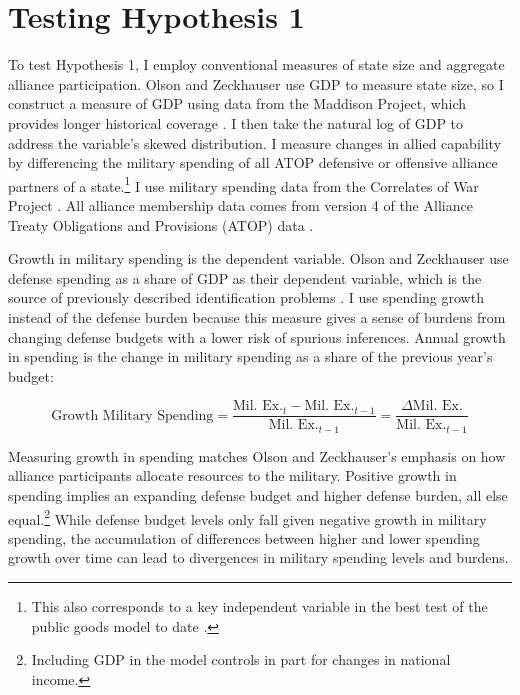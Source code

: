\documentclass[12pt]{article}
\begin{document}
\section{Testing Hypothesis 1}


To test Hypothesis 1, I employ conventional measures of state size and aggregate alliance participation. 
Olson and Zeckhauser use GDP to measure state size, so I construct a measure of GDP using data from the Maddison Project, which provides longer historical coverage \citep{Boltetal2018}. 
I then take the natural log of GDP to address the variable's skewed distribution. 
I measure changes in allied capability by differencing the military spending of all ATOP defensive or offensive alliance partners of a state.\footnote{This also corresponds to a key independent variable in the best test of the public goods model to date \citep{PluemperNeumayer2015}.}
I use military spending data from the Correlates of War Project \citep{SingerCINC1988}.  
All alliance membership data comes from version 4 of the Alliance Treaty Obligations and Provisions (ATOP) data \citep{Leedsetal2002}.  


Growth in military spending is the dependent variable. 
Olson and Zeckhauser use defense spending as a share of GDP as their dependent variable, which is the source of previously described identification problems \citep{Kronmal1993, PluemperNeumayer2015}. 
I use spending growth instead of the defense burden because this measure gives a sense of burdens from changing defense budgets with a lower risk of spurious inferences. 
Annual growth in spending is the change in military spending as a share of the previous year's budget:


\begin{equation}
\mbox{Growth Military Spending} = \frac{\mbox{Mil. Ex.}_t - \mbox{Mil. Ex.}_{t-1} }{ \mbox{Mil. Ex.}_{t-1} } = \frac{\Delta \mbox{Mil. Ex.} }{ \mbox{Mil. Ex.}_{t-1} }
\end{equation} 


Measuring growth in spending matches Olson and Zeckhauser's emphasis on how alliance participants allocate resources to the military.
Positive growth in spending implies an expanding defense budget and higher defense burden, all else equal.\footnote{Including GDP in the model controls in part for changes in national income.} 
While defense budget levels only fall given negative growth in military spending, the accumulation of differences between higher and lower spending growth over time can lead to divergences in military spending levels and burdens. 
\end{document}

